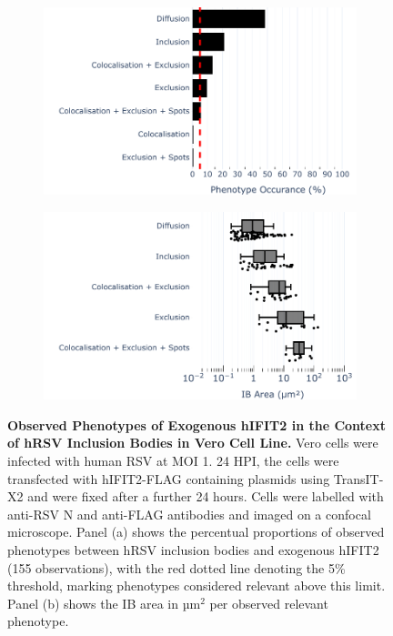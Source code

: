 \begin{figure}
    \begin{subfigure}{0.495\textwidth}
        \caption{}
        \includegraphics[width=1\linewidth]{09. Chapter 4/Figs/02. Overexpression/02. IFIT2/01. bar_hi2f_hrsv.pdf} 
    \end{subfigure}
    \begin{subfigure}{0.495\textwidth}
        \caption{}
        \includegraphics[width=1\linewidth]{09. Chapter 4/Figs/02. Overexpression/02. IFIT2/02. box_hi2f_hrsv.pdf}
    \end{subfigure}
    \caption[Observed Phenotypes of Exogenous hIFIT2 in the Context of hRSV Inclusion Bodies in Vero Cell Line.]{\textbf{Observed Phenotypes of Exogenous hIFIT2 in the Context of hRSV Inclusion Bodies in Vero Cell Line.} Vero cells were infected with human RSV at MOI 1. 24 HPI, the cells were transfected with hIFIT2-FLAG containing plasmids using TransIT-X2 and were fixed after a further 24 hours. Cells were labelled with anti-RSV N and anti-FLAG antibodies and imaged on a confocal microscope. Panel (a) shows the percentual proportions of observed phenotypes between hRSV inclusion bodies and exogenous hIFIT2 (155 observations), with the red dotted line denoting the 5\% threshold, marking phenotypes considered relevant above this limit. Panel (b) shows the IB area in \(\mbox{µm}^2\) per observed relevant phenotype.}
    \label{fig:Observed Phenotypes of Exogenous hIFIT2 in the Context of hRSV Inclusion Bodies in Vero Cell Line}
\end{figure}

